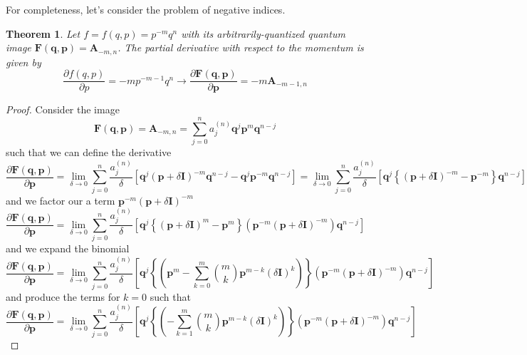 \documentclass[a4paper]{article}
\newtheorem{theorem}{Theorem}[section]
\theoremstyle{definition}
\begin{document}
For completeness, let's consider the problem of negative indices.
\begin{theorem}
	Let $f=f(q,p)=p^{-m}q^n$ with its arbitrarily-quantized quantum image $\textbf{F}(\textbf{q},\textbf{p})=\textbf{A}_{-m,n}$. The partial derivative with respect to the momentum is given by
	\begin{equation}
		\frac{\partial f(q,p)}{\partial p}=-mp^{-m-1}q^n\longrightarrow\frac{\partial\textbf{F}(\textbf{q},\textbf{p})}{\partial \textbf{p}}=-m\textbf{A}_{-m-1,n}
	\end{equation}
\end{theorem}
\begin{proof}
	Consider the image
	\begin{equation}
		\textbf{F}(\textbf{q},\textbf{p})=\textbf{A}_{-m,n}=\sum_{j=0}^na_j^{(n)}\textbf{q}^j\textbf{p}^m\textbf{q}^{n-j}
	\end{equation}
	such that we can define the derivative
	\begin{equation}
		\frac{\partial \textbf{F}(\textbf{q},\textbf{p})}{\partial \textbf{p}}=\lim_{\delta\to0}\sum_{j=0}^n\frac{a_j^{(n)}}{\delta}\left[\textbf{q}^j\left(\textbf{p}+\delta\textbf{I}\right)^{-m}\textbf{q}^{n-j}-\textbf{q}^j\textbf{p}^{-m}\textbf{q}^{n-j}\right]=\lim_{\delta\to0}\sum_{j=0}^n\frac{a_j^{(n)}}{\delta}\left[\textbf{q}^j\left\{(\textbf{p}+\delta\textbf{I})^{-m}-\textbf{p}^{-m}\right\}\textbf{q}^{n-j}\right]
	\end{equation}
	and we factor our a term $\textbf{p}^{-m}(\textbf{p}+\delta\textbf{I})^{-m}$
	\begin{equation}
		\frac{\partial \textbf{F}(\textbf{q},\textbf{p})}{\partial \textbf{p}}=\lim_{\delta\to0}\sum_{j=0}^n\frac{a_j^{(n)}}{\delta}\left[\textbf{q}^j\left\{(\textbf{p}+\delta\textbf{I})^{m}-\textbf{p}^{m}\right\}(\textbf{p}^{-m}(\textbf{p}+\delta\textbf{I})^{-m})\textbf{q}^{n-j}\right]
	\end{equation}
	and we expand the binomial
	\begin{equation}
		\frac{\partial \textbf{F}(\textbf{q},\textbf{p})}{\partial \textbf{p}}=\lim_{\delta\to0}\sum_{j=0}^n\frac{a_j^{(n)}}{\delta}\left[\textbf{q}^j\left\{\left(\textbf{p}^{m}-\sum_{k=0}^m\binom{m}{k}\textbf{p}^{m-k}(\delta\textbf{I})^k\right)\right\}(\textbf{p}^{-m}(\textbf{p}+\delta\textbf{I})^{-m})\textbf{q}^{n-j}\right]
	\end{equation}
	and produce the terms for $k=0$ such that
	\begin{equation}
		\frac{\partial \textbf{F}(\textbf{q},\textbf{p})}{\partial \textbf{p}}=\lim_{\delta\to0}\sum_{j=0}^n\frac{a_j^{(n)}}{\delta}\left[\textbf{q}^j\left\{\left(-\sum_{k=1}^m\binom{m}{k}\textbf{p}^{m-k}(\delta\textbf{I})^k\right)\right\}(\textbf{p}^{-m}(\textbf{p}+\delta\textbf{I})^{-m})\textbf{q}^{n-j}\right]

\end{equation}
\end{proof}
\end{document}
